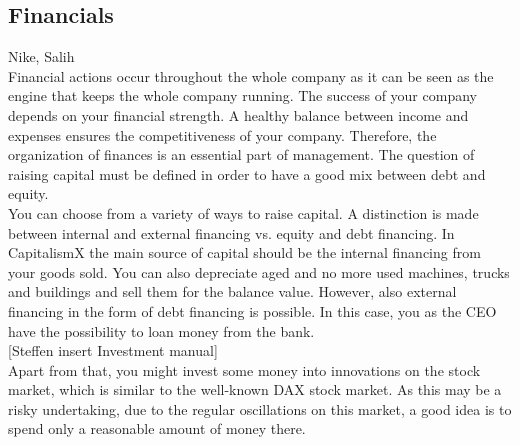 \subsection{Financials} \label{finance_manual}
Nike, Salih\\

Financial actions occur throughout the whole company as it can be seen as the engine that keeps the whole company running. The success of your company depends on your financial strength. A healthy balance between income and expenses ensures the competitiveness of your company. Therefore, the organization of finances is an essential part of management. The question of raising capital must be defined in order to have a good mix between debt and equity.\\

You can choose from a variety of ways to raise capital. A distinction is made between internal and external financing vs. equity and debt financing.
In CapitalismX the main source of capital should be the internal financing from your goods sold. You can also depreciate aged and no more used machines, trucks and buildings and sell them for the balance value. However, also external financing in the form of debt financing is possible. In this case, you as the CEO have the possibility to loan money from the bank.\\

[Steffen insert Investment manual]\\
Apart from that, you might invest some money into innovations on the stock market, which is similar to the well-known DAX stock market. As this may be a risky undertaking, due to the regular oscillations on this market, a good idea is to spend only a reasonable amount of money there. \\


